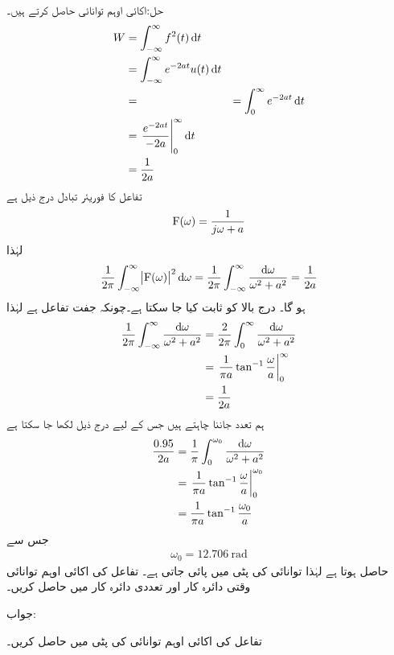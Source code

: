 حل:اکائی اوہم توانائی حاصل کرتے ہیں۔
\begin{align*}
W&=\int_{-\infty}^{\infty} f^2(t)\dif t\\
&=\int_{-\infty}^{\infty} e^{-2at}u(t) \dif t\\
&=&=\int_{0}^{\infty} e^{-2at} \dif t\\
&=\left. \frac{e^{-2at}}{-2a}  \right|_{0}^{\infty}\dif t\\
&=\frac{1}{2a}
\end{align*}
تفاعل کا فوریئر تبادل درج ذیل ہے
\begin{align*}
{\ensuremath{{\textup{F}}}}(\omega)=\frac{1}{j\omega+a}
\end{align*}
لہٰذا 
\begin{align*}
\frac{1}{2\pi}\int_{-\infty}^{\infty} \abs{\bF(\omega)}^2 \dif \omega=\frac{1}{2\pi}\int_{-\infty}^{\infty}\frac{\dif \omega}{\omega^2+a^2}  =\frac{1}{2a}
\end{align*}
ہو گا۔ درج بالا کو ثابت کیا جا سکتا ہے۔چونکہ  جفت تفاعل ہے لہٰذا
\begin{align*}
\frac{1}{2\pi}\int_{-\infty}^{\infty}\frac{\dif \omega}{\omega^2+a^2}&=\frac{2}{2\pi}\int_{0}^{\infty}\frac{\dif \omega}{\omega^2+a^2}\\
&=\left. \frac{1}{\pi a} \tan^{-1}\frac{\omega}{a}\right|_{0}^{\infty}\\
&=\frac{1}{2a}
\end{align*}
ہم تعدد  جاننا چاہتے ہیں جس کے لیے درج ذیل لکھا جا سکتا ہے
\begin{align*}
\frac{0.95}{2a}&=\frac{1}{\pi}\int_0^{\omega_0} \frac{\dif \omega}{\omega^2+a^2}\\
&=\left. \frac{1}{\pi a} \tan^{-1}\frac{\omega}{a} \right|_0^{\omega_0}\\
&=\frac{1}{\pi a} \tan^{-1} \frac{\omega_0}{a}
\end{align*}
جس سے
\begin{align*}
\omega_0=\SI{12.706}{\radian}
\end{align*}
حاصل ہوتا ہے لہٰذا  توانائی  کی پٹی میں پائی جاتی ہے۔ 
تفاعل  کی اکائی اوہم توانائی وقتی دائرہ کار اور تعددی دائرہ کار میں حاصل کریں۔

جواب:

تفاعل  کی اکائی اوہم توانائی  کی پٹی میں حاصل کریں۔

